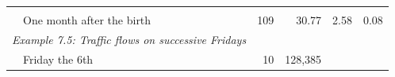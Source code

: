 \documentclass[11pt,a4paper,openany]{book}
\begin{document}
\begin{longtable}[]{@{}lrrrr@{}}
\begin{minipage}[t]{0.07\columnwidth}
\strut
\end{minipage} & \begin{minipage}[t]{0.08\columnwidth}\raggedleft\strut
\strut
\end{minipage}\tabularnewline
\begin{minipage}[t]{0.55\columnwidth}\raggedright\strut
~~One month after the birth \newline\strut
\end{minipage} & \begin{minipage}[t]{0.06\columnwidth}\raggedleft\strut
109\strut
\end{minipage} & \begin{minipage}[t]{0.10\columnwidth}\raggedleft\strut
30.77\strut
\end{minipage} & \begin{minipage}[t]{0.07\columnwidth}\raggedleft\strut
2.58\strut
\end{minipage} & \begin{minipage}[t]{0.08\columnwidth}\raggedleft\strut
0.08\strut
\end{minipage}\tabularnewline
\begin{minipage}[t]{0.55\columnwidth}\raggedright\strut
\emph{Example 7.5: Traffic flows on successive Fridays}\strut
\end{minipage} & \begin{minipage}[t]{0.06\columnwidth}\raggedleft\strut
\strut
\end{minipage} & \begin{minipage}[t]{0.10\columnwidth}\raggedleft\strut
\strut
\end{minipage} & \begin{minipage}[t]{0.07\columnwidth}\raggedleft\strut
\strut
\end{minipage} & \begin{minipage}[t]{0.08\columnwidth}\raggedleft\strut
\strut
\end{minipage}\tabularnewline
\begin{minipage}[t]{0.55\columnwidth}\raggedright\strut
~~Friday the 6th\strut
\end{minipage} & \begin{minipage}[t]{0.06\columnwidth}\raggedleft\strut
10\strut
\end{minipage} & \begin{minipage}[t]{0.10\columnwidth}\raggedleft\strut
128,385\strut
\end{minipage} & \begin{minipage}[t]{0.07\columnwidth}\raggedleft\strut
\strut

\end{minipage}
\end{longtable}
\end{document}

